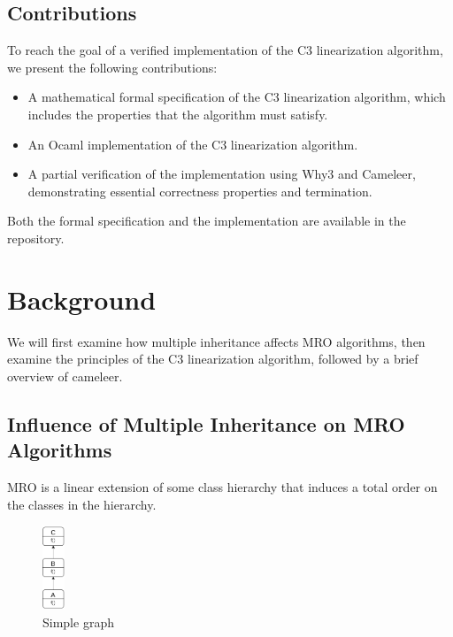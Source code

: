 \documentclass[runningheads]{llncs}
\begin{document}
\subsection{Contributions}
To reach the goal of a verified implementation of the C3 linearization algorithm, we present the following contributions:
\begin{itemize}
    \item A mathematical formal specification of the C3 linearization algorithm, which includes the properties that the algorithm must satisfy.
    \item An Ocaml implementation of the C3 linearization algorithm.
    \item A partial verification of the implementation using Why3 and Cameleer, demonstrating essential correctness properties and termination.
\end{itemize}
Both the formal specification and the implementation are available in the repository\autocite{MiguelflorC3_ocaml_verified}.
\section{Background}

We will first examine how multiple inheritance affects MRO algorithms, then examine the principles of the C3 linearization algorithm, followed by a brief overview of cameleer.

\subsection{Influence of Multiple Inheritance on MRO Algorithms}
MRO is a linear extension of some class hierarchy
 that induces a total order on the classes in the hierarchy\autocite{hivertControllingC3Super2024}.

\begin{figure}[htbp]
  \centering
  \includegraphics[width=0.06\textwidth]{images/SimpleDiagram.png}
  \caption{Simple graph}
  \label{fig:simpleDiagram}
\end{figure}
\end{document}

